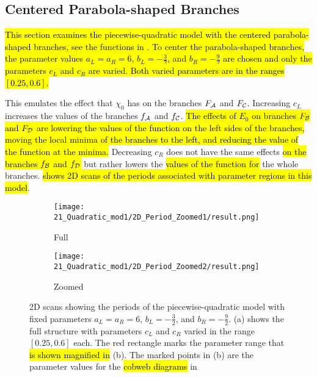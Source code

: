 \subsection{Centered Parabola-shaped Branches}
\label{sec:setup.quad.even}

\hl{
	This section examines the piecewise-quadratic model with the centered parabola-shaped branches, see the functions in .
	To center the parabola-shaped branches, the parameter values $a_L = a_R = 6$, $b_L = -\frac{3}{2}$, and $b_R = -\frac{9}{2}$ are chosen and only the parameters $c_L$ and $c_R$ are varied.
	Both varied parameters are in the ranges $[0.25, 0.6]$.
}

This emulates the effect that $\chi_0$ has on the branches $F_{\mathcal{A}}$ and $F_{\mathcal{C}}$.
Increasing $c_L$ increases the values of the branches $f_{\mathcal{A}}$ and $f_{\mathcal{C}}$.
\hl{
	The effects of $E_0$ on branches $F_{\mathcal{B}}$ and $F_{\mathcal{D}}$ are lowering the values of the function on the left sides of the branches, moving the local minima of the branches to the left, and reducing the value of the function at the minima.
}
Decreasing $c_R$ does not have the same effects \hl{on the branches $f_{\mathcal{B}}$ and $f_{\mathcal{D}}$} but rather lowers the \hl{values of the function for} the whole branches.
 \hl{shows 2D scans of the periods associated with parameter regions in this model}.

\begin{figure}
	\centering
	\begin{subfigure}{0.4\textwidth}
		\centering
		\texttt{[image: 21\_Quadratic\_mod1/2D\_Period\_Zoomed1/result.png]}
		\caption{Full}
		\label{fig:setup.quad.even.period.full}
	\end{subfigure}
	\begin{subfigure}{0.4\textwidth}
		\centering
		\texttt{[image: 21\_Quadratic\_mod1/2D\_Period\_Zoomed2/result.png]}
		\caption{Zoomed}
		\label{fig:setup.quad.even.period.zoomed}
	\end{subfigure}
	\caption[2D scans showing periods of the even piecewise quadratic model]{
		2D scans showing the periods of the piecewise-quadratic model with fixed parameters $a_L = a_R = 6$, $b_L = -\frac{3}{2}$, and $b_R = -\frac{9}{2}$.
		(a) shows the full structure with parameters $c_L$ and $c_R$ varied in the range $[0.25, 0.6]$ each.
		The red rectangle marks the parameter range that \hl{is shown magnified in} (b).
		The marked points in (b) are the parameter values for the \hl{cobweb diagrams} in 
	}
\end{figure}

